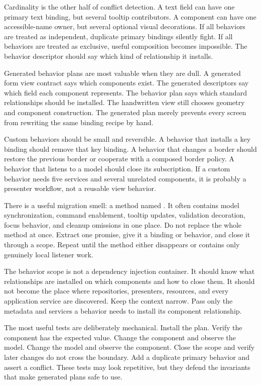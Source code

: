 Cardinality is the other half of conflict detection. A text field can have one
primary text binding, but several tooltip contributors. A component can have one
accessible-name owner, but several optional visual decorations. If all behaviors
are treated as independent, duplicate primary bindings silently fight. If all
behaviors are treated as exclusive, useful composition becomes impossible. The
behavior descriptor should say which kind of relationship it installs.

Generated behavior plans are most valuable when they are dull. A generated form
view contract says which components exist. The generated descriptors say which
field each component represents. The behavior plan says which standard
relationships should be installed. The handwritten view still chooses geometry
and component construction. The generated plan merely prevents every screen from
rewriting the same binding recipe by hand.

Custom behaviors should be small and reversible. A behavior that installs a key
binding should remove that key binding. A behavior that changes a border should
restore the previous border or cooperate with a composed border policy. A
behavior that listens to a model should close its subscription. If a custom
behavior needs five services and several unrelated components, it is probably a
presenter workflow, not a reusable view behavior.

There is a useful migration smell: a method named . It often
contains model synchronization, command enablement, tooltip updates, validation
decoration, focus behavior, and cleanup omissions in one place. Do not replace
the whole method at once. Extract one promise, give it a binding or behavior,
and close it through a scope. Repeat until the method either disappears or
contains only genuinely local listener work.

The behavior scope is not a dependency injection container. It should know what
relationships are installed on which components and how to close them. It should
not become the place where repositories, presenters, resources, and every
application service are discovered. Keep the context narrow. Pass only the
metadata and services a behavior needs to install its component relationship.

The most useful tests are deliberately mechanical. Install the plan. Verify the
component has the expected value. Change the component and observe the model.
Change the model and observe the component. Close the scope and verify later
changes do not cross the boundary. Add a duplicate primary behavior and assert a
conflict. These tests may look repetitive, but they defend the invariants that
make generated plans safe to use.

